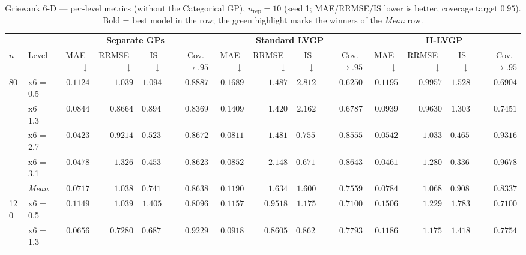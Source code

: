 \begin{table}[htbp]
\centering
\scriptsize
\setlength{\tabcolsep}{2.5pt}
\setlength{\fboxsep}{1pt}
\caption{Griewank 6-D --- per-level metrics (without the Categorical GP), $n_{\mathrm{rep}}=10$ (seed 1; MAE/RRMSE/IS lower is better, coverage target $0.95$). Bold = best model in the row; the green highlight marks the winners of the \emph{Mean} row.}
\label{tab:griewank_6d_nrep10_nocat}
\begin{tabular}{llrrrrrrrrrrrr}
\toprule
 & & \multicolumn{4}{c}{\textbf{Separate GPs}} & \multicolumn{4}{c}{\textbf{Standard LVGP}} & \multicolumn{4}{c}{\textbf{H-LVGP}} \\
\cmidrule(lr){3-6} \cmidrule(lr){7-10} \cmidrule(lr){11-14}
$n$ & Level & MAE~$\downarrow$ & RRMSE~$\downarrow$ & IS~$\downarrow$ & Cov.~$\to.95$ & MAE~$\downarrow$ & RRMSE~$\downarrow$ & IS~$\downarrow$ & Cov.~$\to.95$ & MAE~$\downarrow$ & RRMSE~$\downarrow$ & IS~$\downarrow$ & Cov.~$\to.95$ \\
\midrule
\multirow{5}{*}{80} & x6 = 0.5 & {\boldmath$0.1124$} & $1.039$ & {\boldmath$1.094$} & {\boldmath$0.8887$} & $0.1689$ & $1.487$ & $2.812$ & $0.6250$ & $0.1195$ & {\boldmath$0.9957$} & $1.528$ & $0.6904$ \\
 & x6 = 1.3 & {\boldmath$0.0844$} & {\boldmath$0.8664$} & {\boldmath$0.8943$} & {\boldmath$0.8369$} & $0.1409$ & $1.420$ & $2.162$ & $0.6787$ & $0.0939$ & $0.9630$ & $1.303$ & $0.7451$ \\
 & x6 = 2.7 & {\boldmath$0.0423$} & {\boldmath$0.9214$} & $0.5231$ & $0.8672$ & $0.0811$ & $1.481$ & $0.7551$ & $0.8555$ & $0.0542$ & $1.033$ & {\boldmath$0.4656$} & {\boldmath$0.9316$} \\
 & x6 = 3.1 & $0.0478$ & $1.326$ & $0.4536$ & $0.8623$ & $0.0852$ & $2.148$ & $0.6717$ & $0.8643$ & {\boldmath$0.0461$} & {\boldmath$1.280$} & {\boldmath$0.3360$} & {\boldmath$0.9678$} \\
 & \textit{Mean} & \colorbox{green!20}{\boldmath$0.0717$} & \colorbox{green!20}{\boldmath$1.038$} & \colorbox{green!20}{\boldmath$0.7414$} & \colorbox{green!20}{\boldmath$0.8638$} & $0.1190$ & $1.634$ & $1.600$ & $0.7559$ & $0.0784$ & $1.068$ & $0.9081$ & $0.8337$ \\
\midrule
\multirow{5}{*}{120} & x6 = 0.5 & {\boldmath$0.1149$} & $1.039$ & $1.405$ & {\boldmath$0.8096$} & $0.1157$ & {\boldmath$0.9518$} & {\boldmath$1.175$} & $0.7100$ & $0.1506$ & $1.229$ & $1.783$ & $0.7100$ \\
 & x6 = 1.3 & {\boldmath$0.0656$} & {\boldmath$0.7280$} & {\boldmath$0.6875$} & {\boldmath$0.9229$} & $0.0918$ & $0.8605$ & $0.8627$ & $0.7793$ & $0.1186$ & $1.175$ & $1.418$ & $0.7754$ \\

\end{tabular}
\end{table}
